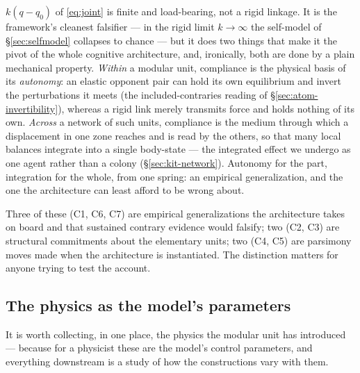 \documentclass{article}
\begin{document}
\begin{description}[itemsep=4pt,labelindent=0pt,leftmargin=2em,
                    style=nextline]
$k(q-q_0)$ of \eqref{eq:joint} is finite and load-bearing, not a rigid
linkage.  It is the framework's cleanest falsifier --- in the rigid limit
$k\to\infty$ the self-model of \S\ref{sec:selfmodel} collapses to chance
--- but it does two things that make it the pivot of the whole cognitive
architecture, and, ironically, both are done by a plain mechanical property.
\emph{Within} a modular unit, compliance is the physical basis of its
\emph{autonomy}: an elastic opponent pair can hold its own equilibrium and
invert the perturbations it meets (the included-contraries reading of
\S\ref{sec:atom-invertibility}), whereas a rigid link merely transmits
force and holds nothing of its own.  \emph{Across} a network of such units,
compliance is the medium through which a displacement in one zone reaches
and is read by the others, so that many local balances integrate into a
single body-state --- the integrated effect we undergo as one agent rather
than a colony (\S\ref{sec:kit-network}).  Autonomy for the part,
integration for the whole, from one spring: an empirical generalization,
and the one the architecture can least afford to be wrong about.
\end{description}

\noindent
Three of these (C1, C6, C7) are empirical generalizations the architecture
takes on board and that sustained contrary evidence would falsify; two
(C2, C3) are structural commitments about the elementary units; two
(C4, C5) are parsimony moves made when the architecture is
instantiated.  The distinction matters for anyone trying to test the
account.

\subsection{The physics as the model's parameters}\label{sec:atom-physics}

It is worth collecting, in one place, the physics the modular unit has
introduced --- because for a physicist these are the model's control
parameters, and everything downstream is a study of how the
constructions vary with them.
\end{document}
